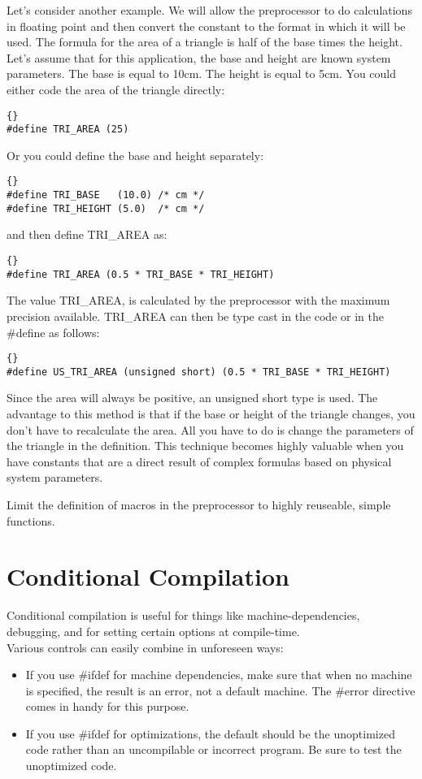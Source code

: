 \documentclass{report}
\begin{document}
Let's consider another example. We will allow the preprocessor to do calculations in floating point and then convert the constant to the format in which it will be used. The formula for the area of a triangle is half of the base times the height. Let's assume that for this application, the base and height are known system parameters. The base is equal to 10cm. The height is equal to 5cm. You could either code the area of the triangle directly: 
\begin{lstlisting}{}
#define TRI_AREA (25)
\end{lstlisting}
Or you could define the base and height separately: 
\begin{lstlisting}{}
#define TRI_BASE   (10.0) /* cm */
#define TRI_HEIGHT (5.0)  /* cm */
\end{lstlisting}
and then define TRI\_AREA as: 
\begin{lstlisting}{}
#define TRI_AREA (0.5 * TRI_BASE * TRI_HEIGHT)
\end{lstlisting}
The value TRI\_AREA, is calculated by the preprocessor with the maximum precision available.
TRI\_AREA can then be type cast in the code or in the \#define as follows: 
\begin{lstlisting}{}
#define US_TRI_AREA (unsigned short) (0.5 * TRI_BASE * TRI_HEIGHT)
\end{lstlisting}
Since the area will always be positive, an unsigned short type is used. The advantage to this method is that if the base or height of the triangle changes, you don't have to recalculate the area. All you have to do is change the parameters of the triangle in the definition. This technique becomes highly valuable when you have constants that are a direct result of complex formulas based on physical system parameters. 

Limit the definition of macros in the preprocessor to highly reuseable, simple functions.


\section{Conditional Compilation}
Conditional compilation is useful for things like machine-dependencies, debugging, and for setting certain options at compile-time.\\
Various controls can easily combine in unforeseen ways:
\begin{itemize}
\item If you use \#ifdef for machine dependencies, make sure that when no machine is specified, the result is an error, not a default machine. The \#error directive comes in handy for this purpose. 
\item If you use \#ifdef for optimizations, the default should be the unoptimized code rather than an uncompilable or incorrect program. Be sure to test the unoptimized code.
\end{itemize}
\end{document}
